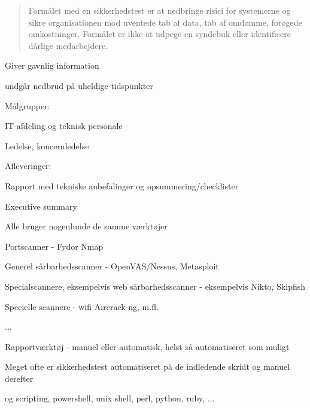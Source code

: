 \documentclass[20pt,landscape,a4paper,footrule]{foils}
\begin{document}

\begin{quote}
Formålet med en sikkerhedstest er at nedbringe risici for systemerne
og sikre organisationen mod uventede tab af data, tab af omdømme,
forøgede omkostninger. Formålet er ikke at udpege en syndebuk eller
identificere dårlige medarbejdere.  
\end{quote}

\begin{list1}
\item Giver gavnlig information
\item undgår nedbrud på uheldige tidspunkter
\item Målgrupper:
\begin{list2}
\item IT-afdeling og teknisk personale
\item Ledelse, koncernledelse    
\end{list2}
\item Afleveringer:
\begin{list2}
\item Rapport med tekniske anbefalinger og opsummering/checklister
\item Executive summary    
\end{list2}
\end{list1}


\begin{list1}
\item Alle bruger nogenlunde de samme værktøjer
\begin{list2}
\item Portscanner - Fydor Nmap
\item Generel sårbarhedsscanner - OpenVAS/Nessus, Metasploit 
\item Specialscannere, eksempelvis web sårbarhedsscanner - eksempelvis Nikto, Skipfish
\item Specielle scannere - wifi Aircrack-ng, m.fl. 
\item ...
\item Rapportværktøj - manuel eller automatisk, helst så automatiseret
  som muligt   
\item Meget ofte er sikkerhedstest automatiseret på de indledende
  skridt og manuel derefter
\end{list2}
\item og scripting, powershell, unix shell, perl, python, ruby, ...
\end{list1}
\end{document}
